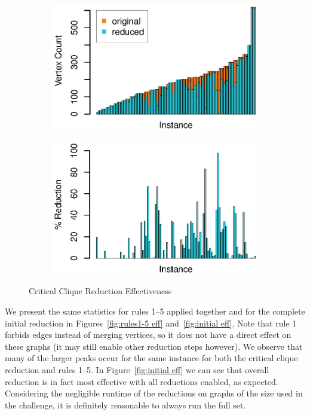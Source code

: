 \documentclass[12pt,oneside,english,parskip=full,headings=small]{scrbook}
\theoremstyle{definition}
\begin{document}
\begin{figure}[h]
	\begin{subfigure}{0.49\textwidth}
		\includegraphics[width=1.0\linewidth]{crit_cliques_absolute}
	\end{subfigure}
	\begin{subfigure}{0.49\textwidth}
		\includegraphics[width=1.0\linewidth]{crit_cliques_percent}
	\end{subfigure}
	\caption{Critical Clique Reduction Effectiveness}
	\label{fig:crit_clique eff}
\end{figure}

We present the same statistics for rules 1--5 applied together and for the complete initial
reduction in Figures~\ref{fig:rules1-5 eff} and~\ref{fig:initial eff}. Note that rule 1 forbids
edges instead of merging vertices, so it does not have a direct effect on these graphs (it may still
enable other reduction steps however). We observe that many of the larger peaks occur for the same
instance for both the critical clique reduction and rules 1--5. In Figure~\ref{fig:initial eff} we
can see that overall reduction is in fact most effective with all reductions enabled, as expected.
Considering the negligible runtime of the reductions on graphs of the size used in the challenge, it
is definitely reasonable to always run the full set.
\end{document}
